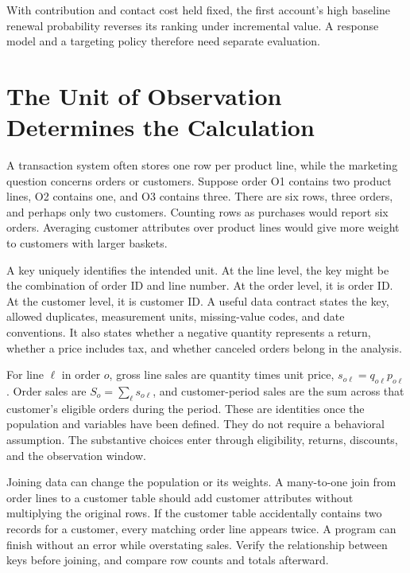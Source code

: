 With contribution and contact cost held fixed, the first account's high
baseline renewal probability reverses its ranking under incremental
value. A response model and a targeting policy therefore need separate
evaluation.

\hypertarget{M01-the-unit-of-observation-determines-the-calculation}{%
\section{The Unit of Observation Determines the
Calculation}\label{M01-the-unit-of-observation-determines-the-calculation}}

\noindent A transaction system often stores one row per product line, while the
marketing question concerns orders or customers. Suppose order O1
contains two product lines, O2 contains one, and O3 contains three.
There are six rows, three orders, and perhaps only two customers.
Counting rows as purchases would report six orders. Averaging customer
attributes over product lines would give more weight to customers with
larger baskets.

A key uniquely identifies the intended unit. At the line level, the key
might be the combination of order ID and line number. At the order
level, it is order ID. At the customer level, it is customer ID. A
useful data contract states the key, allowed duplicates, measurement
units, missing-value codes, and date conventions. It also states whether
a negative quantity represents a return, whether a price includes tax,
and whether canceled orders belong in the analysis.

For line \(\ell\) in order \(o\), gross line sales are quantity times
unit price, \(s_{o\ell}=q_{o\ell}p_{o\ell}\). Order sales are
\(S_o=\sum_\ell s_{o\ell}\), and customer-period sales are the sum
across that customer's eligible orders during the period. These are
identities once the population and variables have been defined. They do
not require a behavioral assumption. The substantive choices enter
through eligibility, returns, discounts, and the observation window.

Joining data can change the population or its weights. A many-to-one
join from order lines to a customer table should add customer attributes
without multiplying the original rows. If the customer table
accidentally contains two records for a customer, every matching order
line appears twice. A program can finish without an error while
overstating sales. Verify the relationship between keys before joining,
and compare row counts and totals afterward.

